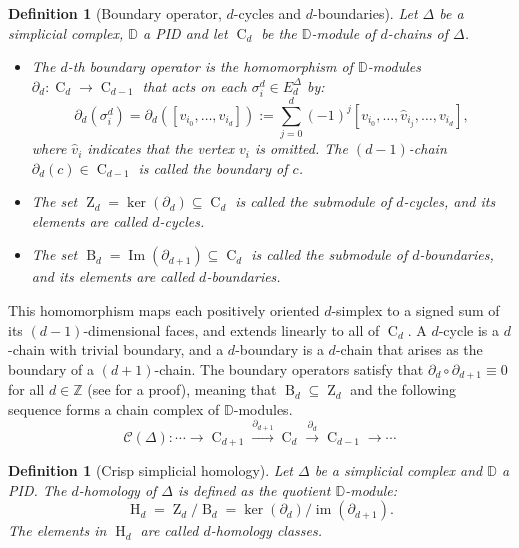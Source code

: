 \documentclass[a4paper,10pt]{article}
\newtheorem{definition}[theorem]{Definition}
\newcommand{\im}{\operatorname{Im}}
\newcommand{\bbd}{\mathbb{D}}
\newcommand{\bbz}{\mathbb{Z}}
\DeclareMathOperator{\Co}{C}
\DeclareMathOperator{\Zo}{Z}
\DeclareMathOperator{\Bo}{B}
\DeclareMathOperator{\Ho}{H}
\begin{document}
\begin{definition}[Boundary operator, \(d\)-cycles and \(d\)-boundaries]
\label{def:boundary}
Let \(\Delta\) be a simplicial complex, \(\bbd\) a PID and let \(\Co_d\) be the \(\bbd\)-module of \(d\)-chains of \(\Delta\). 
\begin{itemize}
\item The \emph{\(d\)-th boundary operator} is the homomorphism of \(\bbd\)-modules \(\partial_d : \Co_d \to \Co_{d-1}\) that acts on each \(\sigma^{d}_{i} \in E^{\Delta}_{d}\) by:
\[
\partial_d(\sigma^{d}_i)=\partial_d([v_{i_0},\ldots,v_{i_d}]) := \sum_{j=0}^d (-1)^j [v_{i_0}, \dots, \hat{v}_{i_j}, \dots, v_{i_d}],
\]
where \(\hat{v}_i\) indicates that the vertex \(v_i\) is omitted. The \((d\!-\!1)\)-chain \(\partial_d(c) \in \Co_{d-1}\) is called the \emph{boundary} of \(c\).
\item The set \(\Zo_d = \ker(\partial_d) \subseteq \Co_d\) is called the \emph{submodule of \(d\)-cycles}, and its elements are called \emph{\(d\)-cycles}.
\item The set \(\Bo_d = \im(\partial_{d+1}) \subseteq \Co_d\) is called the \emph{submodule of \(d\)-boundaries}, and its elements are called \emph{\(d\)-boundaries}.
\end{itemize}
\end{definition}

This homomorphism maps each positively oriented \(d\)-simplex to a signed sum of its \((d\!-\!1)\)-dimensional faces, and extends linearly to all of \(\Co_d\). A \(d\)-cycle is a \(d\)-chain with trivial boundary, and a \(d\)-boundary is a \(d\)-chain that arises as the boundary of a \((d\!+\!1)\)-chain. The boundary operators satisfy that \(\partial_d \circ \partial_{d+1} \equiv 0\) for all 
\(d \in \bbz\)
(see \cite[Chapter 7]{rotman2013introduction} for a proof), meaning that \(\Bo_d \subseteq \Zo_d\) and the following sequence forms a chain complex of \(\bbd\)-modules. 
\[
\mathcal{C}(\Delta): \cdots \longrightarrow \Co_{d+1}\xrightarrow{\partial_{d+1}} \Co_d \xrightarrow{\partial_d} \Co_{d-1} \longrightarrow \cdots
\]

\begin{definition}[Crisp simplicial homology]
\label{def:homology}
Let \(\Delta\) be a simplicial complex and \(\bbd\) a PID. The \emph{\(d\)-homology of \(\Delta\)} is defined as the quotient \(\bbd\)-module:
\[
\Ho_d = \Zo_d/\Bo_d = \ker(\partial_d)/\operatorname{im}(\partial_{d+1}).
\]
The elements in \(\Ho_d\) are called \emph{\(d\)-homology classes}.
\end{definition}
\end{document}

